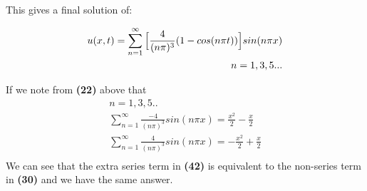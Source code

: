 \documentclass{article}
\begin{document}
This gives a final solution of:
\begin{tcolorbox}[minipage,colback=white,arc=0pt,outer arc=0pt]
\begin{equation}
\begin{aligned}
u(x,t) = \sum_{n=1}^{\infty} \Big{[} \frac{4}{(n\pi)^3}( 1- cos(n\pi t)) \Big{]}sin(n\pi x)\\
n = 1,3,5...
\end{aligned}
\end{equation}
\end{tcolorbox}
If we note from \textbf{(22)} above that 
\begin{equation}
\begin{aligned}
n = 1,3,5..\\
\sum_{n=1}^{\infty}\frac{-4}{(n\pi)^3}sin(n\pi x) = \frac{x^2}{2} - \frac{x}{2}\\
\sum_{n=1}^{\infty}\frac{4}{(n\pi)^3}sin(n\pi x) = -\frac{x^2}{2} +\frac{x}{2}\\
\end{aligned}
\end{equation}
We can see that the extra series term in \textbf{(42)} is equivalent to the non-series term in \textbf{(30)} and we have the same answer.
\end{document}
